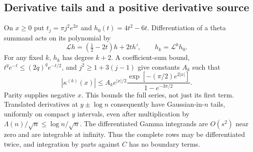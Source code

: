 \subsection{Derivative tails and a positive derivative source}
On $x\ge0$ put $t_j=\pi j^2e^{2x}$ and $h_0(t)=4t^2-6t$.
Differentiation of a theta summand acts on its polynomial by
\[
 \mathscr Lh=(\tfrac12-2t)h+2th',\qquad h_k=\mathscr L^kh_0.
\]
For any fixed $k$, $h_k$ has degree $k+2$. A coefficient-sum bound,
$t^q e^{-t}\le(2q)^q e^{-t/2}$, and
$j^2\ge1+3(j-1)$ give constants $A_k$ such that
\begin{equation}\label{eq:dep-derivative-tail}
 |\kappa^{(k)}(x)|\le
 A_ke^{|x|/2}\frac{\exp[-(\pi/2)e^{2|x|}]}
                         {1-e^{-3\pi/2}}.
\end{equation}
Parity supplies negative $x$. This bounds the full series, not just its
first term. Translated derivatives at $y\pm\log n$ consequently have
Gaussian-in-$n$ tails, uniformly on compact $y$ intervals, even after
multiplication by $\Lambda(n)/\sqrt n\le\log n/\sqrt n$.
The differentiated Gamma integrands are $O(s^2)$ near zero and are
integrable at infinity. Thus the complete rows may be differentiated
twice, and integration by parts against $C$ has no boundary terms.

